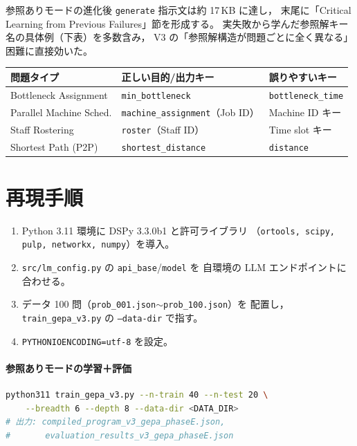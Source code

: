 \documentclass[uplatex,dvipdfmx,a4paper,11pt]{jsarticle}
\begin{document}
参照ありモードの進化後 \texttt{generate} 指示文は約 17\,KB に達し，
末尾に「Critical Learning from Previous Failures」節を形成する。
実失敗から学んだ参照解キー名の具体例（下表）を多数含み，
V3 の「参照解構造が問題ごとに全く異なる」困難に直接効いた。

\begin{center}
\begin{tabular}{lll}
  \toprule
  問題タイプ & 正しい目的/出力キー & 誤りやすいキー \\
  \midrule
  Bottleneck Assignment & \texttt{min\_bottleneck} & \texttt{bottleneck\_time} \\
  Parallel Machine Sched. & \texttt{machine\_assignment}（Job ID） & Machine ID キー \\
  Staff Rostering & \texttt{roster}（Staff ID） & Time slot キー \\
  Shortest Path (P2P) & \texttt{shortest\_distance} & \texttt{distance} \\
  \bottomrule
\end{tabular}
\end{center}

\section{再現手順}\label{sec:repro}

\begin{enumerate}
  \item Python 3.11 環境に DSPy 3.3.0b1 と許可ライブラリ
    （\texttt{ortools, scipy, pulp, networkx, numpy}）を導入。
  \item \texttt{src/lm\_config.py} の \texttt{api\_base}/\texttt{model} を
    自環境の LLM エンドポイントに合わせる。
  \item データ 100 問（\texttt{prob\_001.json}$\sim$\texttt{prob\_100.json}）を
    配置し，\texttt{train\_gepa\_v3.py} の \texttt{--data-dir} で指す。
  \item \texttt{PYTHONIOENCODING=utf-8} を設定。
\end{enumerate}

\paragraph{参照ありモードの学習＋評価}
\begin{lstlisting}[language=bash]
python311 train_gepa_v3.py --n-train 40 --n-test 20 \
    --breadth 6 --depth 8 --data-dir <DATA_DIR>
# 出力: compiled_program_v3_gepa_phaseE.json,
#       evaluation_results_v3_gepa_phaseE.json
\end{lstlisting}
\end{document}
